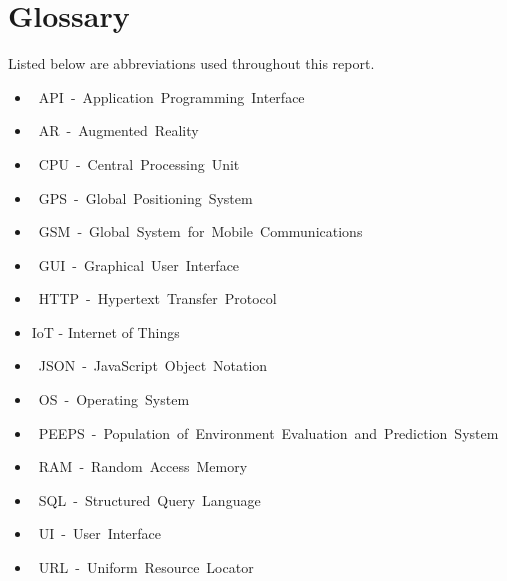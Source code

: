 \chapter*{Glossary}

Listed below are abbreviations used throughout this report.

\begin{itemize}
    \item API - Application Programming Interface
    \item AR - Augmented Reality
    \item CPU - Central Processing Unit 
    \item GPS - Global Positioning System
    \item GSM - Global System for Mobile Communications
    \item GUI - Graphical User Interface
    \item HTTP - Hypertext Transfer Protocol
    \item IoT - Internet of Things
    \item JSON - JavaScript Object Notation
    \item OS - Operating System
    \item PEEPS - Population of Environment Evaluation and Prediction System
    \item RAM - Random Access Memory
    \item SQL - Structured Query Language
    \item UI - User Interface
    \item URL - Uniform Resource Locator    
\end{itemize}
